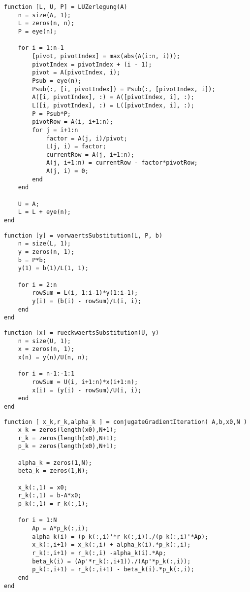 \documentclass[german]{latex4ei/latex4ei_sheet}
\begin{document}
\begin{lstlisting}
function [L, U, P] = LUZerlegung(A)
    n = size(A, 1);
    L = zeros(n, n);
    P = eye(n);

    for i = 1:n-1
        [pivot, pivotIndex] = max(abs(A(i:n, i)));
        pivotIndex = pivotIndex + (i - 1);
        pivot = A(pivotIndex, i);
        Psub = eye(n);
        Psub(:, [i, pivotIndex]) = Psub(:, [pivotIndex, i]);
        A([i, pivotIndex], :) = A([pivotIndex, i], :);
        L([i, pivotIndex], :) = L([pivotIndex, i], :);
        P = Psub*P;
        pivotRow = A(i, i+1:n);
        for j = i+1:n
            factor = A(j, i)/pivot;
            L(j, i) = factor;
            currentRow = A(j, i+1:n);
            A(j, i+1:n) = currentRow - factor*pivotRow;
            A(j, i) = 0;
        end
    end

    U = A;
    L = L + eye(n);
end
\end{lstlisting}

\begin{lstlisting}
function [y] = vorwaertsSubstitution(L, P, b)
    n = size(L, 1);
    y = zeros(n, 1);
    b = P*b;
    y(1) = b(1)/L(1, 1);

    for i = 2:n
        rowSum = L(i, 1:i-1)*y(1:i-1);
        y(i) = (b(i) - rowSum)/L(i, i);
    end
end
\end{lstlisting}

\begin{lstlisting}
function [x] = rueckwaertsSubstitution(U, y)
    n = size(U, 1);
    x = zeros(n, 1);
    x(n) = y(n)/U(n, n);

    for i = n-1:-1:1
        rowSum = U(i, i+1:n)*x(i+1:n);
        x(i) = (y(i) - rowSum)/U(i, i);
    end
end
\end{lstlisting}

\begin{lstlisting}
function [ x_k,r_k,alpha_k ] = conjugateGradientIteration( A,b,x0,N )
    x_k = zeros(length(x0),N+1);
    r_k = zeros(length(x0),N+1);
    p_k = zeros(length(x0),N+1);

    alpha_k = zeros(1,N);
    beta_k = zeros(1,N);

    x_k(:,1) = x0;
    r_k(:,1) = b-A*x0;
    p_k(:,1) = r_k(:,1);

    for i = 1:N
        Ap = A*p_k(:,i);
        alpha_k(i) = (p_k(:,i)'*r_k(:,i))./(p_k(:,i)'*Ap);
        x_k(:,i+1) = x_k(:,i) + alpha_k(i).*p_k(:,i);
        r_k(:,i+1) = r_k(:,i) -alpha_k(i).*Ap;
        beta_k(i) = (Ap'*r_k(:,i+1))./(Ap'*p_k(:,i));
        p_k(:,i+1) = r_k(:,i+1) - beta_k(i).*p_k(:,i);
    end
end
\end{lstlisting}
\end{document}
